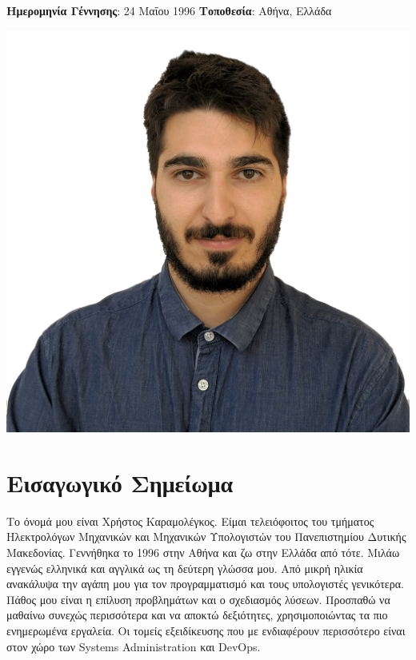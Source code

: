 \documentclass{mycv}
\begin{document}
	\pagestyle{empty}
	\begin{minipage}{0.69\textwidth}
		\begin{flushleft}
			\centering
			{\bf Ημερομηνία Γέννησης}: 24 Μαΐου 1996 {\Large\textperiodcentered} {\bf Τοποθεσία}: Αθήνα, Ελλάδα
		\end{flushleft}
	\end{minipage}
	\begin{minipage}{0.3\textwidth}
		\begin{flushright}
			\includegraphics[scale=0.05]{assets/christos.png}
		\end{flushright}
	\end{minipage}
	\vspace*{-0.5cm}
	\section{Εισαγωγικό Σημείωμα}
	\textnormal Το όνομά μου είναι Χρήστος Καραμολέγκος. Είμαι τελειόφοιτος του τμήματος Ηλεκτρολόγων Μηχανικών και Μηχανικών Υπολογιστών του Πανεπιστημίου Δυτικής Μακεδονίας. Γεννήθηκα το 1996 στην Αθήνα και ζω στην Ελλάδα από τότε. Μιλάω εγγενώς ελληνικά και αγγλικά ως τη δεύτερη γλώσσα μου. Από μικρή ηλικία ανακάλυψα την αγάπη μου για τον προγραμματισμό και τους υπολογιστές γενικότερα. Πάθος μου είναι η επίλυση προβλημάτων και ο σχεδιασμός λύσεων. Προσπαθώ να μαθαίνω συνεχώς περισσότερα και να αποκτώ δεξιότητες, χρησιμοποιώντας τα πιο ενημερωμένα εργαλεία. Οι τομείς εξειδίκευσης που με ενδιαφέρουν περισσότερο είναι στον χώρο των Systems Administration και DevOps.
\end{document}
